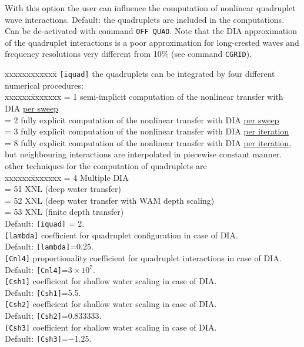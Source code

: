 \documentclass[12pt]{book}
\begin{document}
\noindent
With this option the user can influence the computation of nonlinear quadruplet wave interactions. Default: the quadruplets are included
in the computations. Can be de-activated with command {\tt OFF QUAD}. Note that the DIA approximation of the quadruplet interactions
is a poor approximation for long-crested waves and frequency resolutions very different from 10\% (see command {\tt CGRID}).
\begin{tabbing}
xxxxxxxxxxxx\= \kill
{\tt [iquad]}  \> the quadruplets can be integrated by four different numerical procedures:\+\\
                  \pushtabs
                  xxxxxx\=xxxxxxx \kill
                  = 1 \> semi-implicit computation of the nonlinear transfer with DIA \underline{per sweep}\\
                  = 2 \> fully explicit computation of the nonlinear transfer with DIA \underline{per sweep}\\
                  = 3 \> fully explicit computation of the nonlinear transfer with DIA \underline{per iteration}\\
                  = 8 \> fully explicit computation of the nonlinear transfer with DIA \underline{per iteration},\+\\
                         but neighbouring interactions are interpolated in piecewise constant manner.\-\\
                  \poptabs
                  other techniques for the computation of quadruplets are\\
                  \pushtabs
                  xxxxxx\=xxxxxxx \kill
                  = 4  \> Multiple DIA\\
                  = 51 \> XNL (deep water transfer)\\
                  = 52 \> XNL (deep water transfer with WAM depth scaling)\\
                  = 53 \> XNL (finite depth transfer)\\
                  \poptabs
                  Default: {\tt [iquad]} = 2.\-\\
{\tt [lambda]} \> coefficient for quadruplet configuration in case of DIA.\+\\
                  Default: {\tt [lambda]}=0.25.\-\\
{\tt [Cnl4]}   \> proportionality coefficient for quadruplet interactions in case of DIA.\+\\
                  Default: {\tt [Cnl4]}=$3 \times 10^7$.\-\\
{\tt [Csh1]}   \> coefficient for shallow water scaling in case of DIA.\+\\
                  Default: {\tt [Csh1]}=5.5.\-\\
{\tt [Csh2]}   \> coefficient for shallow water scaling in case of DIA.\+\\
                  Default: {\tt [Csh2]}=0.833333.\-\\
{\tt [Csh3]}   \> coefficient for shallow water scaling in case of DIA.\+\\
                  Default: {\tt [Csh3]}=$-$1.25.\-\\
\end{tabbing}
\end{document}
